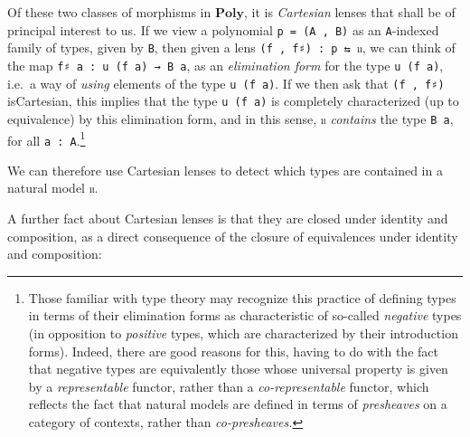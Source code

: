 \documentclass[
  11pt,
  oneside,
  article]{memoir}
\theoremstyle{definition}
\theoremstyle{plain}
\newcommand{\0}{\textsf{0}}
\newcommand{\1}{\tn{\textsf{1}}}
\begin{document}
Of these two classes of morphisms in \(\mathbf{Poly}\), it is
\emph{Cartesian} lenses that shall be of principal interest to us. If we
view a polynomial \texttt{p\ =\ (A\ ,\ B)} as an \texttt{A}-indexed
family of types, given by \texttt{B}, then given a lens
\texttt{(f\ ,\ f♯)\ :\ p\ ⇆\ 𝔲}, we can think of the map
\texttt{f♯\ a\ :\ u\ (f\ a)\ →\ B\ a}, as an \emph{elimination form} for
the type \texttt{u\ (f\ a)}, i.e.~a way of \emph{using} elements of the
type \texttt{u\ (f\ a)}. If we then ask that \texttt{(f\ ,\ f♯)}
isCartesian, this implies that the type \texttt{u\ (f\ a)} is completely
characterized (up to equivalence) by this elimination form, and in this
sense, \texttt{𝔲} \emph{contains} the type \texttt{B\ a}, for all
\texttt{a\ :\ A}.\footnote{Those familiar with type theory may recognize
  this practice of defining types in terms of their elimination forms as
  characteristic of so-called \emph{negative} types (in opposition to
  \emph{positive} types, which are characterized by their introduction
  forms). Indeed, there are good reasons for this, having to do with the
  fact that negative types are equivalently those whose universal
  property is given by a \emph{representable} functor, rather than a
  \emph{co-representable} functor, which reflects the fact that natural
  models are defined in terms of \emph{presheaves} on a category of
  contexts, rather than \emph{co-presheaves.}}

We can therefore use Cartesian lenses to detect which types are
contained in a natural model \texttt{𝔲}.

A further fact about Cartesian lenses is that they are closed under
identity and composition, as a direct consequence of the closure of
equivalences under identity and composition:
\end{document}
